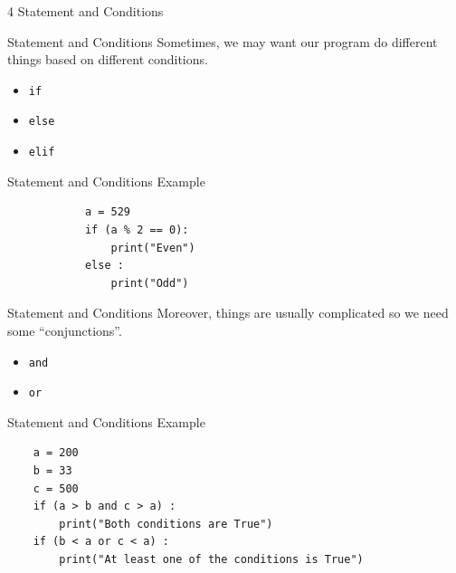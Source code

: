 \documentclass{beamer}
\begin{document}
    \begin{frame}[plain, c]
        \begin{center}
            \color{blue} \LARGE 4 Statement and Conditions
        \end{center}
    \end{frame}
    
    \begin{frame}{Statement and Conditions}
        Sometimes, we may want our program do different things based on different conditions. \\
        \begin{itemize}
            \item \texttt{if}
            \item \texttt{else}
            \item \texttt{elif}
        \end{itemize}
    \end{frame}

    \begin{frame}[fragile]{Statement and Conditions}
        \color{blue} \Large Example \\
        \color{black} \normalsize \vskip 10pt
        \begin{verbatim}
            a = 529
            if (a % 2 == 0):
                print("Even")
            else :
                print("Odd")
        \end{verbatim}
    \end{frame}

    \begin{frame}{Statement and Conditions}
        Moreover, things are usually complicated so we need some ``conjunctions''.
        \begin{itemize}
            \item \texttt{and}
            \item \texttt{or}
        \end{itemize}
    \end{frame}

    \begin{frame}[fragile]{Statement and Conditions}
        \color{blue} \Large Example \\
        \color{black} \normalsize \vskip 10pt
        \begin{verbatim}
    a = 200
    b = 33
    c = 500
    if (a > b and c > a) :
        print("Both conditions are True")
    if (b < a or c < a) :
        print("At least one of the conditions is True")
        \end{verbatim}  
    \end{frame}
\end{document}
